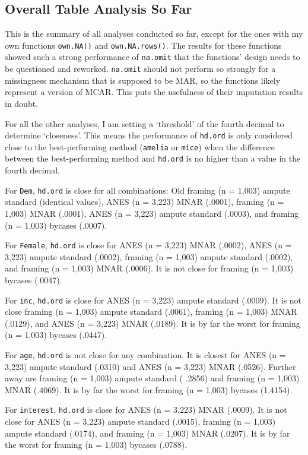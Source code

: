 \documentclass[12pt,econ]{sources/authesis}
\begin{document}
\hypertarget{overall-table-analysis-so-far}{%
\subsection{Overall Table Analysis So Far}\label{overall-table-analysis-so-far}}

This is the summary of all analyses conducted so far, except for the ones with my own functions \texttt{own.NA()} and \texttt{own.NA.rows()}. The results for these functions showed such a strong performance of \texttt{na.omit} that the functions' design needs to be questioned and reworked. \texttt{na.omit} should not perform so strongly for a missingness mechanism that is supposed to be MAR, so the functions likely represent a version of MCAR. This puts the usefulness of their imputation results in doubt.

For all the other analyses, I am setting a `threshold' of the fourth decimal to determine `closeness'. This means the performance of \texttt{hd.ord} is only considered close to the best-performing method (\texttt{amelia} or \texttt{mice}) when the difference between the best-performing method and \texttt{hd.ord} is no higher than a value in the fourth decimal.

For \texttt{Dem}, \texttt{hd.ord} is close for all combinations: Old framing (n = 1,003) ampute standard (identical values), ANES (n = 3,223) MNAR (.0001), framing (n = 1,003) MNAR (.0001), ANES (n = 3,223) ampute standard (.0003), and framing (n = 1,003) bycases (.0007).

For \texttt{Female}, \texttt{hd.ord} is close for ANES (n = 3,223) MNAR (.0002), ANES (n = 3,223) ampute standard (.0002), framing (n = 1,003) ampute standard (.0002), and framing (n = 1,003) MNAR (.0006). It is not close for framing (n = 1,003) bycases (.0047).

For \texttt{inc}, \texttt{hd.ord} is close for ANES (n = 3,223) ampute standard (.0009). It is not close framing (n = 1,003) ampute standard (.0061), framing (n = 1,003) MNAR (.0129), and ANES (n = 3,223) MNAR (.0189). It is by far the worst for framing (n = 1,003) bycases (.0447).

For \texttt{age}, \texttt{hd.ord} is not close for any combination. It is closest for ANES (n = 3,223) ampute standard (.0310) and ANES (n = 3,223) MNAR (.0526). Further away are framing (n = 1,003) ampute standard ( .2856) and framing (n = 1,003) MNAR (.4069). It is by far the worst for framing (n = 1,003) bycases (1.4154).

For \texttt{interest}, \texttt{hd.ord} is close for ANES (n = 3,223) MNAR (.0009). It is not close for ANES (n = 3,223) ampute standard (.0015), framing (n = 1,003) ampute standard (.0174), and framing (n = 1,003) MNAR (.0207). It is by far the worst for framing (n = 1,003) bycases (.0788).
\end{document}
